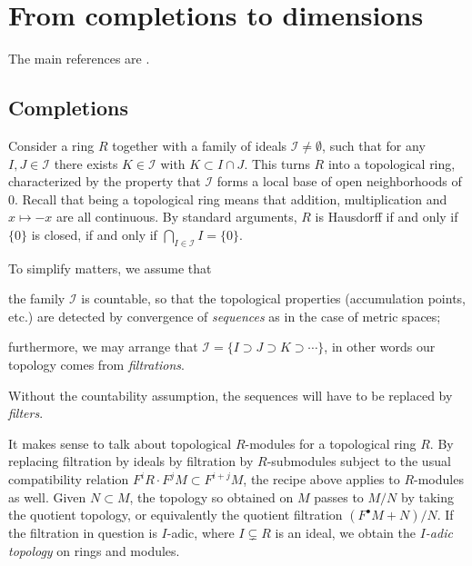 
\chapter{From completions to dimensions}

The main references are \cite{Mat80,Eis95}.
\section{Completions}
Consider a ring $R$ together with a family of ideals $\mathcal{I} \neq \emptyset$, such that for any $I, J \in \mathcal{I}$ there exists $K \in \mathcal{I}$ with $K \subset I \cap J$. This turns $R$ into a topological ring, characterized by the property that $\mathcal{I}$ forms a local base of open neighborhoods of $0$. Recall that being a topological ring means that addition, multiplication and $x \mapsto -x$ are all continuous. By standard arguments, $R$ is Hausdorff if and only if $\{0\}$ is closed, if and only if $\bigcap_{I \in \mathcal{I}} I = \{0\}$.

To simplify matters, we assume that
\begin{compactitem}
	\item the family $\mathcal{I}$ is countable, so that the topological properties (accumulation points, etc.) are detected by convergence of \emph{sequences} as in the case of metric spaces;
	\item furthermore, we may arrange that $\mathcal{I} = \{I \supset J \supset K \supset \cdots \}$, in other words our topology comes from \emph{filtrations}.
\end{compactitem}
Without the countability assumption, the sequences will have to be replaced by \emph{filters}.

It makes sense to talk about topological $R$-modules for a topological ring $R$. By replacing filtration by ideals by filtration by $R$-submodules subject to the usual compatibility relation $F^i R \cdot F^j M \subset F^{i+j} M$, the recipe above applies to $R$-modules as well. Given $N \subset M$, the topology so obtained on $M$ passes to $M/N$ by taking the quotient topology, or equivalently the quotient filtration $(F^\bullet M+N)/N$. If the filtration in question is $I$-adic, where $I \subsetneq R$ is an ideal, we obtain the \emph{$I$-adic topology} on rings and modules.

